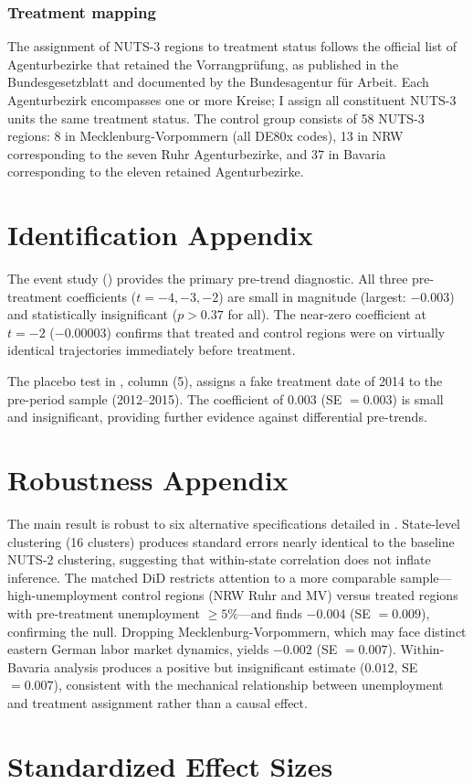 \documentclass[12pt]{article}
\begin{document}
\subsubsection*{Treatment mapping} The assignment of NUTS-3 regions to treatment status follows the official list of Agenturbezirke that retained the Vorrangpr\"ufung, as published in the Bundesgesetzblatt and documented by the Bundesagentur f\"ur Arbeit. Each Agenturbezirk encompasses one or more Kreise; I assign all constituent NUTS-3 units the same treatment status. The control group consists of 58 NUTS-3 regions: 8 in Mecklenburg-Vorpommern (all DE80x codes), 13 in NRW corresponding to the seven Ruhr Agenturbezirke, and 37 in Bavaria corresponding to the eleven retained Agenturbezirke.

\section{Identification Appendix}

The event study () provides the primary pre-trend diagnostic. All three pre-treatment coefficients ($t = -4, -3, -2$) are small in magnitude (largest: $-0.003$) and statistically insignificant ($p > 0.37$ for all). The near-zero coefficient at $t = -2$ ($-0.00003$) confirms that treated and control regions were on virtually identical trajectories immediately before treatment.

The placebo test in , column (5), assigns a fake treatment date of 2014 to the pre-period sample (2012--2015). The coefficient of $0.003$ (SE $= 0.003$) is small and insignificant, providing further evidence against differential pre-trends.

\section{Robustness Appendix}

The main result is robust to six alternative specifications detailed in . State-level clustering (16 clusters) produces standard errors nearly identical to the baseline NUTS-2 clustering, suggesting that within-state correlation does not inflate inference. The matched DiD restricts attention to a more comparable sample---high-unemployment control regions (NRW Ruhr and MV) versus treated regions with pre-treatment unemployment $\geq 5\%$---and finds $-0.004$ (SE $= 0.009$), confirming the null. Dropping Mecklenburg-Vorpommern, which may face distinct eastern German labor market dynamics, yields $-0.002$ (SE $= 0.007$). Within-Bavaria analysis produces a positive but insignificant estimate ($0.012$, SE $= 0.007$), consistent with the mechanical relationship between unemployment and treatment assignment rather than a causal effect.

\section{Standardized Effect Sizes}
\label{sec:sde}


\end{document}
